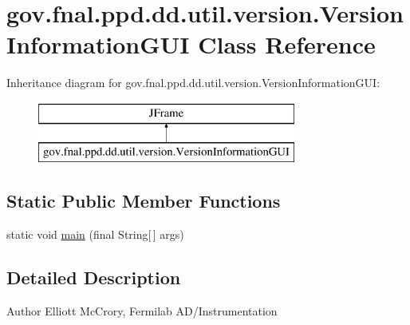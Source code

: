 \hypertarget{classgov_1_1fnal_1_1ppd_1_1dd_1_1util_1_1version_1_1VersionInformationGUI}{\section{gov.\-fnal.\-ppd.\-dd.\-util.\-version.\-Version\-Information\-G\-U\-I Class Reference}
\label{classgov_1_1fnal_1_1ppd_1_1dd_1_1util_1_1version_1_1VersionInformationGUI}
}
Inheritance diagram for gov.\-fnal.\-ppd.\-dd.\-util.\-version.\-Version\-Information\-G\-U\-I\-:\begin{figure}[H]
\begin{center}
\leavevmode
\includegraphics[height=2.000000cm]{classgov_1_1fnal_1_1ppd_1_1dd_1_1util_1_1version_1_1VersionInformationGUI}
\end{center}
\end{figure}
\subsection*{Static Public Member Functions}
\begin{DoxyCompactItemize}
\item 
static void \hyperlink{classgov_1_1fnal_1_1ppd_1_1dd_1_1util_1_1version_1_1VersionInformationGUI_af31ef0bbe7ac5b7acc1a2b0860714270}{main} (final String\mbox{[}$\,$\mbox{]} args)
\end{DoxyCompactItemize}


\subsection{Detailed Description}
\begin{DoxyAuthor}{Author}
Elliott Mc\-Crory, Fermilab A\-D/\-Instrumentation 
\end{DoxyAuthor}


